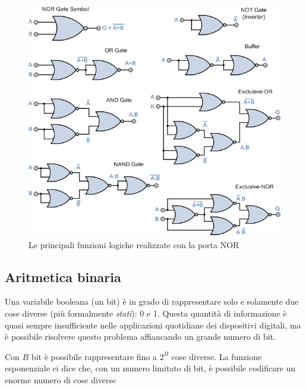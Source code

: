 \documentclass{article}
\begin{document}
\begin{figure}[h]
  \centering
  \includegraphics[scale=0.7]{IM_NOR_allpowerful}
  \caption{Le principali funzioni logiche realizzate con la porta NOR}
  \label{NOR_allpowerful}
\end{figure}

\clearpage











\subsection{Aritmetica binaria}

Una variabile booleana (un bit) è in grado di rappresentare solo e solamente due cose diverse (più formalmente \textit{stati}): 0 e 1. Questa quantità di informazione è quasi sempre insufficiente nelle applicazioni quotidiane dei dispositivi digitali, ma è possibile risolvere questo problema affiancando un grande numero di bit.

\vspace{1mm}

Con $B$ bit è possibile rappresentare fino a $2^B$ cose diverse. La funzione esponenziale ci dice che, con un numero limitato di bit, è possibile codificare un enorme numero di cose diverse
\end{document}
